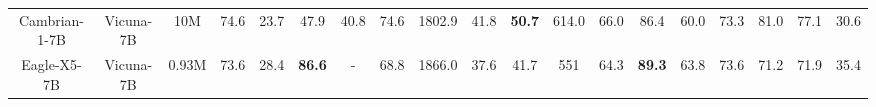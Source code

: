 \begin{table*}[ht]
{\begin{tabular}{ccc|cccccccccccccccc}
        Cambrian-1-7B & \hspace{-0.9em}Vicuna-7B & \hspace{-0.9em}10M & \hspace{-0.5em}74.6 & \hspace{-0.9em}23.7 & \hspace{-0.9em}47.9 & \hspace{-0.9em}40.8 & \hspace{-0.9em}74.6 & \hspace{-0.9em}1802.9 & \hspace{-0.9em}41.8 & \hspace{-0.9em}\textbf{50.7} & \hspace{-0.9em}614.0 & \hspace{-0.9em}66.0 & \hspace{-0.9em}86.4 & \hspace{-0.9em}60.0 & \hspace{-0.9em}73.3 & \hspace{-0.9em}81.0 & \hspace{-0.9em}77.1 & \hspace{-0.9em}30.6 \\ 
        Eagle-X5-7B & \hspace{-0.9em}Vicuna-7B & \hspace{-0.9em}0.93M & \hspace{-0.5em}73.6 & \hspace{-0.9em}28.4 & \hspace{-0.9em}\textbf{86.6} & \hspace{-0.9em}- & \hspace{-0.9em}68.8 & \hspace{-0.9em}1866.0 & \hspace{-0.9em}37.6 & \hspace{-0.9em}41.7 & \hspace{-0.9em}551 & \hspace{-0.9em}64.3 & \hspace{-0.9em}\textbf{89.3} & \hspace{-0.9em}63.8 & \hspace{-0.9em}73.6 & \hspace{-0.9em}71.2 & \hspace{-0.9em}71.9 & \hspace{-0.9em}35.4 \\ 

\end{tabular}}
\end{table*}
